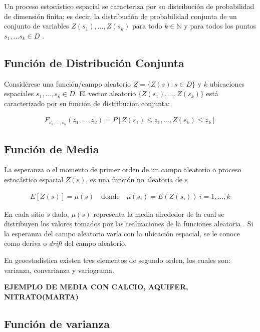 \documentclass[
]{book}
\begin{document}
Un proceso estocástico espacial se caracteriza por su distribución de probabilidad de dimensión finita; es decir, la distribución de probabilidad conjunta de un conjunto de variables \(Z(s_1),...,Z(s_k)\) para todo \(k \in \mathbb{N}\) y para todos los puntos \(s_1,...s_k \in D\) \citep{marta}.

\hypertarget{funciuxf3n-de-distribuciuxf3n-conjunta}{%
\subsection{Función de Distribución Conjunta}\label{funciuxf3n-de-distribuciuxf3n-conjunta}}

Considérese una función/campo aleatorio \(Z=\{Z(s):s\in D\}\) y \(k\) ubicaciones espaciales \(s_1,...,s_k \in D\). El vector aleatorio \(\{Z(s_1),...,Z(s_k)\}\) está caracterizado por su función de distribución conjunta:

\begin{align}
F_{s_1,...,s_k}(z_1,...,z_2)=P[Z(s_1)\leq z_1,...,Z(s_k)\leq z_k]
\end{align}

\hypertarget{funciuxf3n-de-media}{%
\subsection{Función de Media}\label{funciuxf3n-de-media}}

La esperanza o el momento de primer orden de un campo aleatorio o proceso estocástico espacial \(Z(s)\), es una función no aleatoria de \(s\)

\begin{align}
E[Z(s)]=\mu(s)\quad\text{donde}\quad \mu(s_i)=E(Z(s_i))\ i=1,...,k    
\end{align}

En cada sitio \(s\) dado, \(\mu(s)\) representa la media alrededor de la cual se distribuyen los valores tomados por las realizaciones de la funciones aleatoria \citep{Ramon}. Si la esperanza del campo aleatorio varía con la ubicación espacial, se le conoce como deriva o \emph{drift} del campo aleatorio.

En geoestadística existen tres elementos de segundo orden, los cuales son: varianza, convarianza y variograma.

\textbf{EJEMPLO DE MEDIA CON CALCIO, AQUIFER, NITRATO(MARTA)}

\hypertarget{funciuxf3n-de-varianza}{%
\subsection{Función de varianza}\label{funciuxf3n-de-varianza}}
\end{document}
